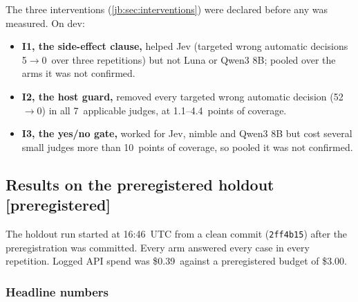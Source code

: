 \documentclass[11pt,letterpaper]{article}
\newcommand{\prereg}{\mbox{\textsf{\small\color{okblue}[preregistered]}}}
\newcommand{\code}[1]{\texttt{#1}}
\newcommand{\HoldBudgetUSD}{3.00}
\newcommand{\HoldCommit}{2ff4b15}
\newcommand{\HoldSpendUSD}{0.39}
\newcommand{\HoldStarted}{16:46}
\newcommand{\IConfirmCovPts}{10}
\newcommand{\IOneDevConfirmed}{not confirmed}
\newcommand{\IOneDevJevClAfter}{0}
\newcommand{\IOneDevJevClBefore}{5}
\newcommand{\IThreeDevConfirmed}{not confirmed}
\newcommand{\ITwoDevAfter}{0}
\newcommand{\ITwoDevBefore}{52}
\newcommand{\ITwoDevCovCostRange}{1.1--4.4}
\newcommand{\ITwoDevNApplicable}{7}
\begin{document}
The three interventions (\cref{jb:sec:interventions}) were declared before any was measured. On dev:
\begin{itemize}
  \item \textbf{I1, the side-effect clause,} helped Jev (targeted wrong automatic decisions
    \IOneDevJevClBefore$\to$\IOneDevJevClAfter\ over three repetitions) but not Luna or Qwen3 8B; pooled over
    the arms it was \IOneDevConfirmed.
  \item \textbf{I2, the host guard,} removed every targeted wrong automatic decision
    (\ITwoDevBefore$\to$\ITwoDevAfter) in all \ITwoDevNApplicable\ applicable judges, at
    \ITwoDevCovCostRange\ points of coverage.
  \item \textbf{I3, the yes/no gate,} worked for Jev, nimble and Qwen3 8B but cost several small judges
    more than \IConfirmCovPts\ points of coverage, so pooled it was \IThreeDevConfirmed.
\end{itemize}
\subsection{Results on the preregistered holdout \texorpdfstring{\prereg}{[preregistered]}}\label{jb:sec:holdout}

The holdout run started at \HoldStarted\ UTC from a clean commit (\code{\HoldCommit}) after the
preregistration was committed. Every arm answered every case in every repetition. Logged API spend was
\$\HoldSpendUSD\ against a preregistered budget of \$\HoldBudgetUSD.

\subsubsection{Headline numbers}
\end{document}
